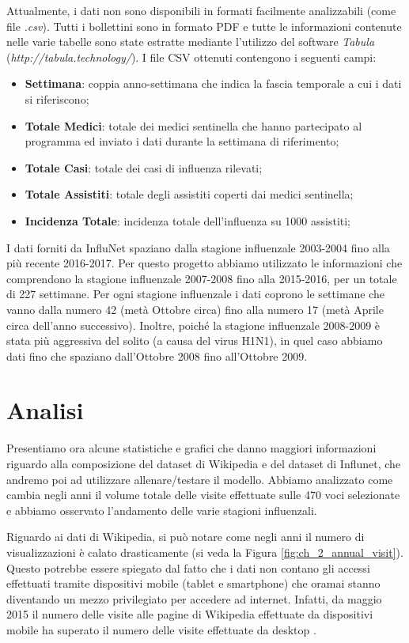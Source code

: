 Attualmente, i dati non sono disponibili in formati facilmente analizzabili (come file \textit{.csv}). Tutti i bollettini
sono in formato PDF e tutte le informazioni contenute nelle varie tabelle sono state estratte mediante l'utilizzo del software \textit{Tabula} (\textit{http://tabula.technology/}). I file CSV ottenuti contengono i seguenti campi:
\begin{itemize}[noitemsep]
\item \textbf{Settimana}: coppia anno-settimana che indica la fascia temporale a cui i dati si riferiscono;
\item \textbf{Totale Medici}: totale dei medici sentinella che hanno partecipato al programma ed inviato i dati durante la settimana di riferimento; 
\item \textbf{Totale Casi}: totale dei casi di influenza rilevati;
\item \textbf{Totale Assistiti}: totale degli assistiti coperti dai medici sentinella;
\item \textbf{Incidenza Totale}: incidenza totale dell'influenza su 1000 assistiti;
\end{itemize}
\bigskip

I dati forniti da InfluNet spaziano dalla stagione influenzale 2003-2004 fino alla più recente 2016-2017. Per questo progetto 
abbiamo utilizzato le informazioni che comprendono la stagione influenzale 2007-2008 fino alla 2015-2016, per un totale di 
227 settimane. Per ogni stagione influenzale i dati coprono le settimane che vanno dalla numero 42 (metà Ottobre circa) fino 
alla numero 17 (metà Aprile circa dell'anno successivo). Inoltre, poiché la stagione influenzale 2008-2009 è stata più 
aggressiva del solito (a causa del virus H1N1), in quel caso abbiamo dati fino che spaziano dall'Ottobre 2008 fino 
all'Ottobre 2009.

\section{Analisi}
\bigskip

Presentiamo ora alcune statistiche e grafici che danno maggiori informazioni riguardo alla composizione del dataset di 
Wikipedia e del dataset di Influnet, che andremo poi ad utilizzare allenare/testare il modello. Abbiamo analizzato come 
cambia negli anni il volume totale delle visite effettuate sulle 470 voci selezionate e abbiamo osservato 
l'andamento delle varie stagioni influenzali.
\bigskip

Riguardo ai dati di Wikipedia, si può notare come negli anni il numero di visualizzazioni è calato drasticamente (si veda la 
Figura \ref{fig:ch_2_annual_visit}). Questo potrebbe essere spiegato dal fatto che i dati non contano gli accessi effettuati 
tramite dispositivi mobile (tablet e smartphone) che oramai stanno diventando un mezzo privilegiato per accedere ad internet. 
Infatti, da maggio 2015 il numero delle visite alle pagine di Wikipedia effettuate da dispositivi mobile ha superato il 
numero delle visite effettuate da desktop \cite{wikipedia_mobile_desktop}.
\bigskip

